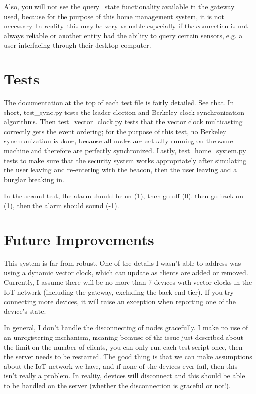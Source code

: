 \documentclass[]{article}
\begin{document}
Also, you will not see the query\_state functionality available in the gateway used, because for the purpose of this home management system, it is not necessary. In reality, this may be very valuable especially if the connection is not always reliable or another entity had the ability to query certain sensors, e.g. a user interfacing through their desktop computer.

\section{Tests}

The documentation at the top of each test file is fairly detailed. See that. In short, test\_sync.py tests the leader election and Berkeley clock synchronization algorithms. Then test\_vector\_clock.py tests that the vector clock multicasting correctly gets the event ordering; for the purpose of this test, no Berkeley synchronization is done, because all nodes are actually running on the same machine and therefore are perfectly synchronized. Lastly, test\_home\_system.py tests to make sure that the security system works appropriately after simulating the user leaving and re-entering with the beacon, then the user leaving and a burglar breaking in.

In the second test, the alarm should be on (1), then go off (0), then go back on (1), then the alarm should sound (-1).

\section{Future Improvements}

This system is far from robust. One of the details I wasn't able to address was using a dynamic vector clock, which can update as clients are added or removed. Currently, I assume there will be no more than 7 devices with vector clocks in the IoT network (including the gateway, excluding the back-end tier). If you try connecting more devices, it will raise an exception when reporting one of the device's state.

In general, I don't handle the disconnecting of nodes gracefully. I make no use of an unregistering mechanism, meaning because of the issue just described about the limit on the number of clients, you can only run each test script once, then the server needs to be restarted. The good thing is that we can make assumptions about the IoT network we have, and if none of the devices ever fail, then this isn't really a problem. In reality, devices will disconnect and this should be able to be handled on the server (whether the disconnection is graceful or not!).
\end{document}
